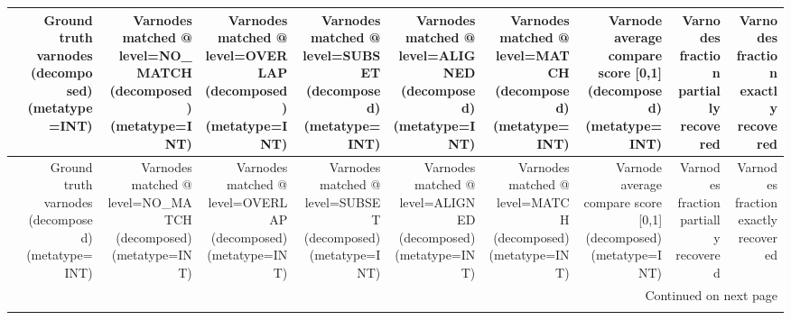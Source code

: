 \begin{longtable}{lrrrrrrrrr}
\toprule
{} &  Ground truth varnodes (decomposed) (metatype=INT) &  Varnodes matched @ level=NO\_MATCH (decomposed) (metatype=INT) &  Varnodes matched @ level=OVERLAP (decomposed) (metatype=INT) &  Varnodes matched @ level=SUBSET (decomposed) (metatype=INT) &  Varnodes matched @ level=ALIGNED (decomposed) (metatype=INT) &  Varnodes matched @ level=MATCH (decomposed) (metatype=INT) &  Varnode average compare score {[}0,1] (decomposed) (metatype=INT) &  Varnodes fraction partially recovered &  Varnodes fraction exactly recovered \\
\midrule
\endfirsthead

\toprule
{} &  Ground truth varnodes (decomposed) (metatype=INT) &  Varnodes matched @ level=NO\_MATCH (decomposed) (metatype=INT) &  Varnodes matched @ level=OVERLAP (decomposed) (metatype=INT) &  Varnodes matched @ level=SUBSET (decomposed) (metatype=INT) &  Varnodes matched @ level=ALIGNED (decomposed) (metatype=INT) &  Varnodes matched @ level=MATCH (decomposed) (metatype=INT) &  Varnode average compare score {[}0,1] (decomposed) (metatype=INT) &  Varnodes fraction partially recovered &  Varnodes fraction exactly recovered \\
\midrule
\endhead
\midrule
\multicolumn{10}{r}{{Continued on next page}} \\
\midrule
\endfoot


\end{longtable}
